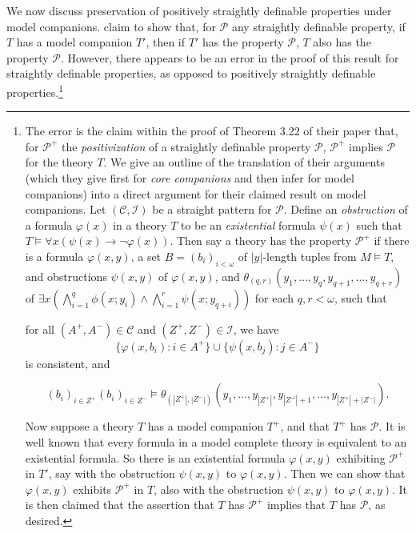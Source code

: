 \documentclass[10pt,a4paper]{amsart}
\newcommand{\calC}{\mathcal{C}}
\newcommand{\calI}{\mathcal{I}}
\newcommand{\vphi}{\varphi}
\begin{document}
We now discuss preservation of positively straightly definable properties under model companions. \cite{bodirsky2025taking} claim to show that, for $\mathcal{P}$ any straightly definable property, if $T$ has a model companion $T'$, then if $T'$ has the property $\mathcal{P}$, $T$ also has the property $\mathcal{P}$. However, there appears to be an error in the proof of this result for straightly definable properties, as opposed to positively straightly definable properties.\footnote{The error is the claim within the proof of Theorem 3.22 of their paper that, for $\mathcal{P}^{+}$ the \textit{positivization} of a straightly definable property $\mathcal{P}$,  $\mathcal{P}^{+}$ implies $\mathcal{P}$ for the theory $T$. We give an outline of the translation of their arguments (which they give first for \textit{core companions} and then infer for model companions) into a direct argument for their claimed result on model companions. Let $(\mathcal{C}, \mathcal{I})$ be a straight pattern for $\mathcal{P}$. Define an \textit{obstruction} of a formula $\varphi(x)$ in a theory $T$ to be an \textit{existential} formula $\psi(x)$ such that $T \models \forall x(\psi(x) \to \neg\varphi(x))$. Then say a theory has the property $\mathcal{P}^{+}$ if there is a formula $\varphi(x, y)$, a set $B=(b_i)_{i<\omega}$ of $|y|$-length tuples from $M\models T$, and obstructions $\psi(x, y)$ of $\varphi(x, y)$, and $\theta_{(q,r)}(y_1, \dots, y_q, y_{q+1}, \dots, y_{q+r})$ of $\exists x \left( \bigwedge_{i=1}^q \phi(x; y_i) \wedge \bigwedge_{i=1}^r \psi(x; y_{q+i}) \right)$ for each $q, r < \omega$, such that


for all $(A^+,A^-)\in \calC$ and $(Z^+,Z^-)\in \calI$, we have 
    \[\{\vphi(x,b_i)\colon i\in A^+\}\cup \{\psi(x,b_j)\colon j\in A^-\}\] is consistent, and


    $$(b_{i})_{i \in Z^{+}}(b_{i})_{i \in Z^{-}} \models \theta_{(|Z^{+}|, |Z^{-}|)}(y_1, \dots, y_{|Z^{+}|}, y_{|Z^{+}|+1}, \dots, y_{|Z^{+}|+|Z^{-}|}).$$


    Now suppose a theory $T$ has a model companion $T^{+}$, and that $T^{+}$ has $\mathcal{P}$. It is well known that every formula in a model complete theory is equivalent to an existential formula. So there is an existential formula $\varphi(x, y)$ exhibiting $\mathcal{P}^{+}$ in $T'$, say with the obstruction $\psi(x, y)$ to $\varphi(x, y)$. Then we can show that $\varphi(x, y)$ exhibits $\mathcal{P}^{+}$ in $T$, also with the obstruction $\psi(x, y)$ to $\varphi(x, y)$. It is then claimed that the assertion that $T$ has $\mathcal{P}^{+}$ implies that $T$ has $\mathcal{P}$, as desired.

}
\end{document}
